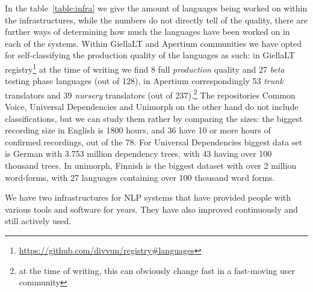 \documentclass[free]{flammie}
\begin{document}
In the table~\ref{table:infra} we give the amount of languages being worked on within the infrastructures, while the numbers do not directly tell of the quality, there are further ways of determining how much the languages have been worked on in each of the systems.
Within GiellaLT and Apertium communities we have opted for self-classifying the production quality of the languages as such: in GiellaLT registry\footnote{\url{https://github.com/divvun/registry\#languages}} at the time of writing we find  8 full \textit{production} quality and 27 \textit{beta} testing phase languages (out of 128), in Apertium correspondingly 53 \textit{trunk} translators and 39 \textit{nursery} translators (out of 237).\footnote{at the time of writing, this can obviously change fast in a fast-moving user community}
The repositories Common Voice, Universal Dependencies and Unimorph on the other hand do not include classifications, but we can study them rather by comparing the sizes: the biggest recording size in English is 1800 hours, and 36 have 10 or more hours of confirmed recordings, out of the 78.
For Universal Dependencies biggest data set is German with 3.753 million dependency trees, with 43 having over 100 thousand trees.
In unimorph, Finnish is the biggest dataset with over 2 million word-forms, with 27 languages containing over 100 thousand word forms.







We have two infrastructures for NLP systems that have provided people with various tools and software for years.
They have also improved continuously and still actively used.
\end{document}
